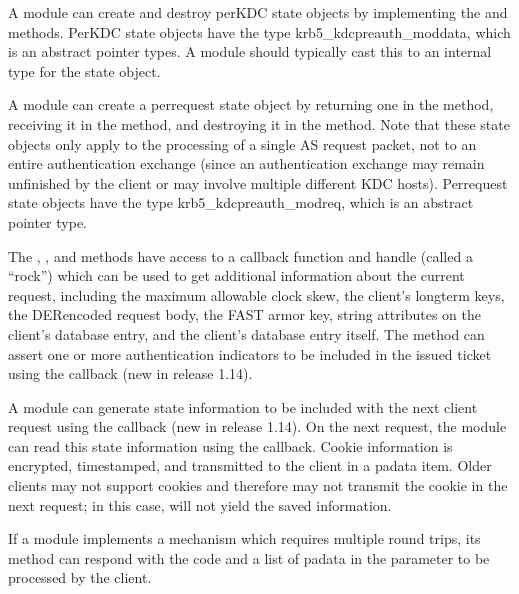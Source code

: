 \documentclass[letterpaper,10pt,english]{sphinxmanual}
\begin{document}
\sphinxAtStartPar
A module can create and destroy per\sphinxhyphen{}KDC state objects by implementing
the  and  methods.  Per\sphinxhyphen{}KDC state objects have the
type krb5\_kdcpreauth\_moddata, which is an abstract pointer types.  A
module should typically cast this to an internal type for the state
object.

\sphinxAtStartPar
A module can create a per\sphinxhyphen{}request state object by returning one in the
 method, receiving it in the  method, and
destroying it in the  method.  Note that these state
objects only apply to the processing of a single AS request packet,
not to an entire authentication exchange (since an authentication
exchange may remain unfinished by the client or may involve multiple
different KDC hosts).  Per\sphinxhyphen{}request state objects have the type
krb5\_kdcpreauth\_modreq, which is an abstract pointer type.

\sphinxAtStartPar
The , , and  methods have access
to a callback function and handle (called a “rock”) which can be used
to get additional information about the current request, including the
maximum allowable clock skew, the client’s long\sphinxhyphen{}term keys, the
DER\sphinxhyphen{}encoded request body, the FAST armor key, string attributes on the
client’s database entry, and the client’s database entry itself.  The
 method can assert one or more authentication indicators to
be included in the issued ticket using the 
callback (new in release 1.14).

\sphinxAtStartPar
A module can generate state information to be included with the next
client request using the  callback (new in release
1.14).  On the next request, the module can read this state
information using the  callback.  Cookie information is
encrypted, timestamped, and transmitted to the client in a
 pa\sphinxhyphen{}data item.  Older clients may not support cookies
and therefore may not transmit the cookie in the next request; in this
case,  will not yield the saved information.

\sphinxAtStartPar
If a module implements a mechanism which requires multiple round
trips, its  method can respond with the code
 and a list of pa\sphinxhyphen{}data in
the  parameter to be processed by the client.
\end{document}
